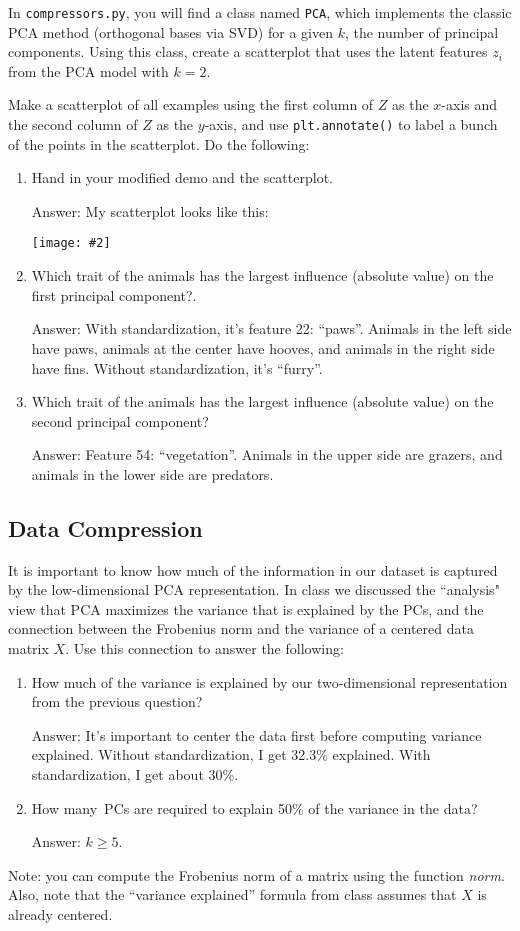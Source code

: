 \documentclass{article}
\def\ans#1{\par\gre{Answer: #1}}
\def\blu#1{{\color{blu}#1}}
\def\gre#1{{\color{gre}#1}}
\newcommand{\centerfig}[2]{\begin{center}\texttt{[image: \#2]}\end{center}}
\def\enum#1{\begin{enumerate}#1\end{enumerate}}
\begin{document}
In \texttt{compressors.py}, you will find a class named \texttt{PCA}, which implements the classic PCA method (orthogonal bases via SVD) for a given $k$, the number of principal components. Using this class, create a scatterplot that uses the latent features $z_i$ from the PCA model with $k=2$. 
\blu{Make a scatterplot of all examples using the first column of $Z$ as the $x$-axis and the second column of $Z$ as the $y$-axis, and use \texttt{plt.annotate()} to label a bunch of the points in the scatterplot. Do the following:
	\enum{
		\item  Hand in your modified demo and the scatterplot.
		\ans {
			My scatterplot looks like this:
			\centerfig{.7}{"../figs/animals_pca.pdf"}
		}
		\item Which trait of the animals has the largest influence (absolute value) on the first principal component?.
		\ans{
			With standardization, it's feature 22: ``paws''. Animals in the left side have paws, animals at the center have hooves, and animals in the right side have fins. Without standardization, it's ``furry''. 
		}
		\item Which trait of the animals has the largest influence (absolute value) on the second principal component?
		\ans{
			Feature 54: ``vegetation''. Animals in the upper side are grazers, and animals in the lower side are predators.
		}
	}
}


\subsection{Data Compression}

It is important to know how much of the information in our dataset is captured by the low-dimensional PCA representation.
In class we discussed the ``analysis" view that PCA maximizes the variance that is explained by the PCs, and the connection between the Frobenius norm and the variance of a centered data matrix $X$. Use this connection to answer the following:
\blu{\enum{
		\item How much of the variance is explained by our two-dimensional representation from the previous question?
		\ans {It's important to center the data first before computing variance explained. Without standardization, I get 32.3\% explained. With standardization, I get about 30\%.}
		\item How many\ PCs are required to explain 50\% of the variance in the data?
		\ans {$k \geq 5$.}
}}
Note: you can compute the Frobenius norm of a matrix using the function \emph{norm}. Also, note that the ``variance explained'' formula from class assumes that $X$ is already centered.
\end{document}
